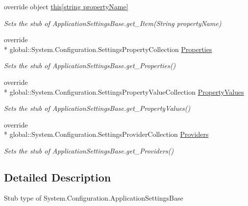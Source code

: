 \begin{DoxyCompactItemize}
override object \hyperlink{class_system_1_1_configuration_1_1_fakes_1_1_stub_application_settings_base_ac2ec23cb4a731145d81d8bc4d166526d}{this\mbox{[}string property\-Name\mbox{]}}
\begin{DoxyCompactList}\small\item\em Sets the stub of Application\-Settings\-Base.\-get\-\_\-\-Item(\-String property\-Name)\end{DoxyCompactList}\item 
override \\*
global\-::\-System.\-Configuration.\-Settings\-Property\-Collection \hyperlink{class_system_1_1_configuration_1_1_fakes_1_1_stub_application_settings_base_a77357c08cb4c7f6deebf3b84ab8aca1d}{Properties}
\begin{DoxyCompactList}\small\item\em Sets the stub of Application\-Settings\-Base.\-get\-\_\-\-Properties()\end{DoxyCompactList}\item 
override \\*
global\-::\-System.\-Configuration.\-Settings\-Property\-Value\-Collection \hyperlink{class_system_1_1_configuration_1_1_fakes_1_1_stub_application_settings_base_a2bd5805f9aa5bf613931e6090a1de854}{Property\-Values}
\begin{DoxyCompactList}\small\item\em Sets the stub of Application\-Settings\-Base.\-get\-\_\-\-Property\-Values()\end{DoxyCompactList}\item 
override \\*
global\-::\-System.\-Configuration.\-Settings\-Provider\-Collection \hyperlink{class_system_1_1_configuration_1_1_fakes_1_1_stub_application_settings_base_a70d9c03d530a398be5187d2505f60ad2}{Providers}
\begin{DoxyCompactList}\small\item\em Sets the stub of Application\-Settings\-Base.\-get\-\_\-\-Providers()\end{DoxyCompactList}\end{DoxyCompactItemize}


\subsection{Detailed Description}
Stub type of System.\-Configuration.\-Application\-Settings\-Base



